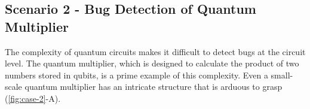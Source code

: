 
\subsection{Scenario 2 - Bug Detection of Quantum Multiplier}
\label{sec:scenario-2}
The complexity of quantum circuits makes it difficult to detect bugs at the circuit level.
The quantum multiplier, which is designed to calculate the product of two numbers stored in qubits, is a prime example of this complexity.
Even a small-scale quantum multiplier has an intricate structure that is arduous to grasp (\cref{fig:case-2}-A).

